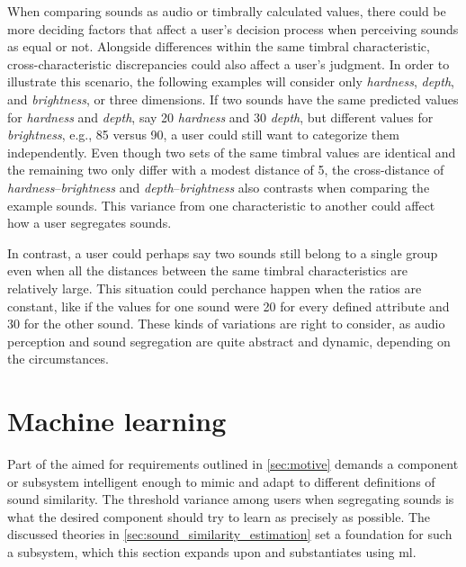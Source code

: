When comparing sounds as audio or timbrally calculated values, there could be more deciding factors that affect a user's decision process when perceiving sounds as equal or not. Alongside differences within the same timbral characteristic, cross-characteristic discrepancies could also affect a user's judgment. In order to illustrate this scenario, the following examples will consider only \emph{hardness}, \emph{depth}, and \emph{brightness}, or three dimensions. If two sounds have the same predicted values for \emph{hardness} and \emph{depth}, say 20 \emph{hardness} and 30 \emph{depth}, but different values for \emph{brightness}, e.g., 85 versus 90, a user could still want to categorize them independently. Even though two sets of the same timbral values are identical and the remaining two only differ with a modest distance of 5, the cross-distance of \emph{hardness}–\emph{brightness} and \emph{depth}–\emph{brightness} also contrasts when comparing the example sounds. This variance from one characteristic to another could affect how a user segregates sounds.

In contrast, a user could perhaps say two sounds still belong to a single group even when all the distances between the same timbral characteristics are relatively large. This situation could perchance happen when the ratios are constant, like if the values for one sound were 20 for every defined attribute and 30 for the other sound. These kinds of variations are right to consider, as audio perception and sound segregation are quite abstract and dynamic, depending on the circumstances.

\section{Machine learning}
Part of the aimed for requirements outlined in \cref{sec:motive} demands a component or subsystem intelligent enough to mimic and adapt to different definitions of sound similarity. The threshold variance among users when segregating sounds is what the desired component should try to learn as precisely as possible. The discussed theories in \cref{sec:sound_similarity_estimation} set a foundation for such a subsystem, which this section expands upon and substantiates using \gls{ml}.

